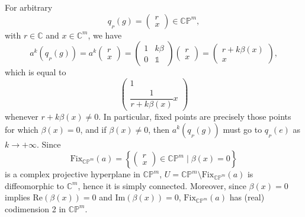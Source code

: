 \documentclass[10pt,a4paper]{amsart}
\numberwithin{equation}{section}
\theoremstyle{definition}
\begin{document}
For arbitrary \[q_{{}_P}(g)=\begin{pmatrix}r \\ x\end{pmatrix}\in\mathbb{CP}^m,\] with $r\in\mathbb{C}$ and $x\in\mathbb{C}^m$, we have \[a^k(q_{{}_P}(g))=a^k\begin{pmatrix}r \\ x\end{pmatrix}=\begin{pmatrix}1 & k\beta \\ 0 & \mathds{1}\end{pmatrix}\begin{pmatrix}r \\ x\end{pmatrix}=\begin{pmatrix}r+k\beta(x) \\ x\end{pmatrix},\] which is equal to \[\begin{pmatrix}1 \\ \dfrac{1}{r+k\beta(x)}x\end{pmatrix}\] whenever $r+k\beta(x)\neq 0$. In particular, fixed points are precisely those points for which $\beta(x)=0$, and if $\beta(x)\neq 0$, then $a^k(q_{{}_P}(g))$ must go to $q_{{}_P}(e)$ as $k\rightarrow +\infty$. Since
\[\mathrm{Fix}_{\mathbb{CP}^m}(a)=\left\{\begin{pmatrix}r \\ x\end{pmatrix}\in\mathbb{CP}^m\mid \beta(x)=0\right\}\]
is a complex projective hyperplane in $\mathbb{CP}^m$, $U=\mathbb{CP}^m\setminus\mathrm{Fix}_{\mathbb{CP}^m}(a)$ is diffeomorphic to $\mathbb{C}^m$, hence it is simply connected. Moreover, since $\beta(x)=0$ implies $\mathrm{Re}(\beta(x))=0$ and $\mathrm{Im}(\beta(x))=0$, $\mathrm{Fix}_{\mathbb{CP}^m}(a)$ has (real) codimension 2 in $\mathbb{CP}^m$.
\end{document}
